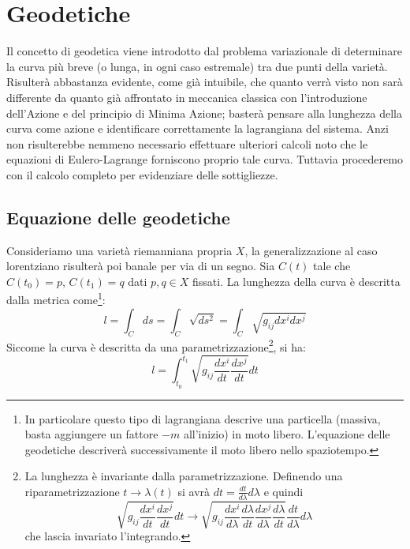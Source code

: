 \chapter{Geodetiche}
Il concetto di geodetica viene introdotto dal problema variazionale di determinare la curva più breve (o lunga, in ogni caso estremale) tra due punti della varietà. Risulterà abbastanza evidente, come già intuibile, che quanto verrà visto non sarà differente da quanto già affrontato in meccanica classica con l'introduzione dell'Azione e del principio di Minima Azione; basterà pensare alla lunghezza della curva come azione e identificare correttamente la lagrangiana del sistema. Anzi non risulterebbe nemmeno necessario effettuare ulteriori calcoli noto che le equazioni di Eulero-Lagrange forniscono proprio tale curva. Tuttavia procederemo con il calcolo completo per evidenziare delle sottigliezze.

\section{Equazione delle geodetiche}\label{para.geodetiche}
Consideriamo una varietà riemanniana propria $X$, la generalizzazione al caso lorentziano risulterà poi banale per via di un segno. Sia $C(t)$ tale che $C(t_0)=p$, $C(t_1)= q$ dati $p, q \in X$ fissati. La lunghezza della curva è descritta dalla metrica come\footnote{In particolare questo tipo di lagrangiana descrive una particella (massiva, basta aggiungere un fattore $-m$ all'inizio) in moto libero. L'equazione delle geodetiche descriverà successivamente il moto libero nello spaziotempo.}:
\begin{equation*}
    l = \int_{C}ds = \int_{C} \sqrt{ds^2} = \int_{C}\sqrt{g_{ij}dx^idx^j}
\end{equation*}
Siccome la curva è descritta da una parametrizzazione\footnote{La lunghezza è invariante dalla parametrizzazione. Definendo una riparametrizzazione $t\rightarrow\lambda(t)$ si avrà $dt= \frac{dt}{d\lambda}d\lambda$ e quindi $$\sqrt{g_{ij}\frac{dx^i}{dt}\frac{dx^j}{dt}}dt \rightarrow \sqrt{g_{ij}\frac{dx^i}{d\lambda}\frac{d\lambda}{dt}\frac{dx^j}{d\lambda}\frac{d\lambda}{dt}}\frac{dt}{d\lambda}d\lambda$$ che lascia invariato l'integrando.}, si ha:
\begin{equation*}
    l = \int_{t_0}^{t_1}\sqrt{g_{ij}\frac{dx^i}{dt}\frac{dx^j}{dt}}dt
\end{equation*}

